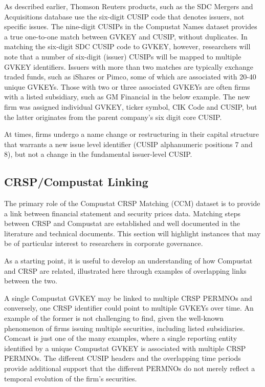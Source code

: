 \documentclass[12pt]{article}
\begin{document}
As described earlier, Thomson Reuters products, such as the SDC Mergers and Acquisitions database use the six-digit CUSIP code that denotes issuers, not specific issues.
The nine-digit CUSIPs in the Compustat Names dataset provides a true one-to-one match between GVKEY and CUSIP, without duplicates.
In matching the six-digit SDC CUSIP code to GVKEY, however, researchers will note that a number of six-digit (issuer) CUSIPs will be mapped to multiple GVKEY identifiers.
Issuers with more than two matches are typically exchange traded funds, such as iShares or Pimco, some of which are associated with 20-40 unique GVKEYs.
Those with two or three associated GVKEYs are often firms with a listed subsidiary, such as GM Financial in the below example.
The new firm was assigned individual GVKEY, ticker symbol, CIK Code and CUSIP, but the latter originates from the parent company's six digit core CUSIP.

\begin{center}

\end{center}

At times, firms undergo a name change or restructuring in their capital structure that warrants a new issue level identifier (CUSIP alphanumeric positions 7 and 8), but not a change in the fundamental issuer-level CUSIP.


\subsection{CRSP/Compustat Linking}\label{sec:CCM}

The primary role of the Compustat CRSP Matching (CCM) dataset is to provide a link between financial statement and security prices data.
Matching steps between CRSP and Compustat are established and well documented in the literature and technical documents.
This section will highlight instances that may be of particular interest to researchers in corporate governance.

As a starting point, it is useful to develop an understanding of how Compustat and CRSP are related, illustrated here through examples of overlapping links between the two.

A single Compustat GVKEY may be linked to multiple CRSP PERMNOs and conversely, one CRSP identifier could point to multiple GVKEYs over time.
An example of the former is not challenging to find, given the well-known phenomenon of firms issuing multiple securities, including listed subsidiaries.
Comcast is just one of the many examples, where a single reporting entity identified by a unique Compustat GVKEY is associated with multiple CRSP PERMNOs.
The different CUSIP headers and the overlapping time periods provide additional support that the different PERMNOs do not merely reflect a temporal evolution of the firm's securities.
\end{document}
